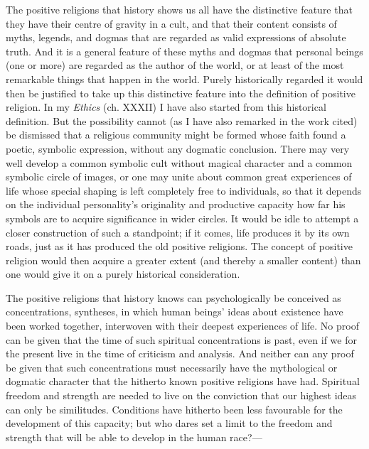 \documentclass[12pt,a4paper]{book}
\newcommand{\opage}[1]{\marginnote{\footnotesize\textit{[#1]}}}
\begin{document}
The positive religions that history shows us all have the distinctive feature that they have their
centre of gravity in a cult, and that their content consists of myths, legends, and dogmas that are
regarded as valid expressions of absolute truth. And it is a general feature of these myths and dogmas
that personal beings (one or more) are regarded as the author of the world, or at least of the most
remarkable things that happen in the world. Purely historically regarded it would then be justified to
take up this distinctive feature into the definition of positive religion. In my \emph{Ethics} (ch.
XXXII) I have also started from this historical definition. But the possibility cannot (as I have also
remarked in the work cited) be dismissed that a religious community might be formed whose faith found
a poetic, symbolic expression, without any dogmatic conclusion. There may very well develop a common
symbolic cult without magical character and a common symbolic circle of images, or one may unite about
common great experiences of life whose special shaping is left completely free to individuals, so that
it depends on the individual 
\opage{172}personality's originality and productive capacity how far his symbols are
to acquire significance in wider circles. It would be idle to attempt a closer construction of such a
standpoint; if it comes, life produces it by its own roads, just as it has produced the old positive
religions. The concept of positive religion would then acquire a greater extent (and thereby a smaller
content) than one would give it on a purely historical consideration.

The positive religions that history knows can psychologically be conceived as concentrations, syntheses,
in which human beings' ideas about existence have been worked together, interwoven with their deepest
experiences of life. No proof can be given that the time of such spiritual concentrations is past, even
if we for the present live in the time of criticism and analysis. And neither can any proof be given
that such concentrations must necessarily have the mythological or dogmatic character that the hitherto
known positive religions have had. Spiritual freedom and strength are needed to live on the conviction
that our highest ideas can only be similitudes. Conditions have hitherto been less favourable for the
development of this capacity; but who dares set a limit to the freedom and strength that will be able
to develop in the human race?---
\end{document}
